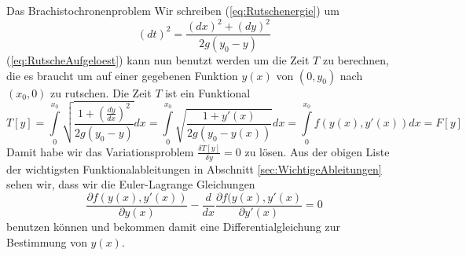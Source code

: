 \begin{example}{Das Brachistochronenproblem}
 Wir schreiben (\ref{eq:Rutschenergie}) um
 \begin{equation}
   (dt)^2=\frac{(dx)^2+(dy)^2}{2g(y_0-y)}
   \label{eq:RutscheAufgeloest}
 \end{equation}
 (\ref{eq:RutscheAufgeloest}) kann nun benutzt werden um die Zeit $T$ zu berechnen,
 die es braucht um auf einer gegebenen Funktion $y(x)$ von $(0,y_0)$ nach
 $(x_0,0)$ zu rutschen. Die Zeit $T$ ist ein Funktional
 \begin{equation}
    T[y]=\int\limits_{0}^{x_0}\sqrt{\frac{1+\left(\frac{dy}{dx}\right)^2}{2g(y_0-y)}}dx
    =\int\limits_{0}^{x_0}\sqrt{\frac{1+y'(x)}{2g(y_0-y(x))}}dx
    =\int\limits_{0}^{x_0}f(y(x),y'(x))dx=F[y]
   \label{eq:Zeitfunktional}
 \end{equation}
 Damit habe wir das Variationsproblem $\frac{\delta T[y]}{\delta y}=0$ zu
 lösen. Aus der obigen Liste der wichtigsten Funktionalableitungen in
 Abschnitt \ref{sec:WichtigeAbleitungen} sehen wir, dass wir die Euler-Lagrange
 Gleichungen
 \[ 
   \frac{\partial f(y(x),y'(x))}{\partial y(x)}
    -\frac{d}{dx} \frac{\partial f(y(x),y'(x)}{\partial y'(x)}=0
 \]
 benutzen können und bekommen damit eine Differentialgleichung zur Bestimmung
 von $y(x)$.
\end{example}
%
